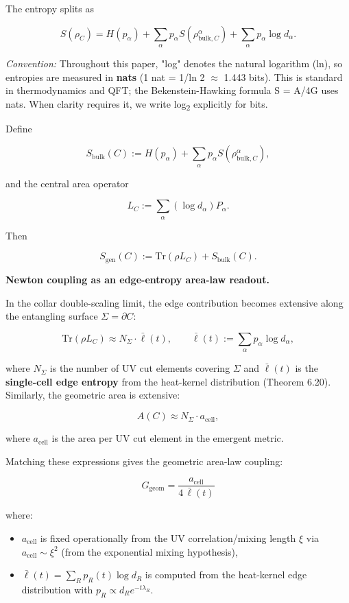 The entropy splits as

\[
S(\rho_C) = H(p_{\alpha}) + \sum_{\alpha} p_{\alpha} S(\rho_{\mathrm{bulk},C}^{\alpha}) + \sum_{\alpha} p_{\alpha} \log d_{\alpha}.
\]

\emph{Convention:} Throughout this paper, "log" denotes the natural logarithm (ln), so entropies are measured in \textbf{nats} (1 nat = 1/ln 2 \ensuremath{\approx} 1.443 bits). This is standard in thermodynamics and QFT; the Bekenstein-Hawking formula S = A/4G uses nats. When clarity requires it, we write log\textsubscript{2} explicitly for bits.

Define

\[
S_{\mathrm{bulk}}(C) := H(p_{\alpha}) + \sum_{\alpha} p_{\alpha} S(\rho_{\mathrm{bulk},C}^{\alpha}),
\]

and the central area operator

\[
L_C := \sum_{\alpha} (\log d_{\alpha}) P_{\alpha}.
\]

Then

\[
S_{\mathrm{gen}}(C) := \mathrm{Tr}(\rho L_C) + S_{\mathrm{bulk}}(C).
\]

\textbf{Newton coupling as an edge-entropy area-law readout.}

In the collar double-scaling limit, the edge contribution becomes extensive along the entangling surface \(\Sigma = \partial C\):

\[
\mathrm{Tr}(\rho L_C) \approx N_\Sigma \cdot \bar{\ell}(t),
\qquad
\bar{\ell}(t) := \sum_\alpha p_\alpha \log d_\alpha,
\]

where \(N_\Sigma\) is the number of UV cut elements covering \(\Sigma\) and \(\bar{\ell}(t)\) is the \textbf{single-cell edge entropy} from the heat-kernel distribution (Theorem 6.20). Similarly, the geometric area is extensive:

\[
A(C) \approx N_\Sigma \cdot a_{\mathrm{cell}},
\]

where \(a_{\mathrm{cell}}\) is the area per UV cut element in the emergent metric.

Matching these expressions gives the geometric area-law coupling:

\[
G_{\mathrm{geom}} = \frac{a_{\mathrm{cell}}}{4 \, \bar{\ell}(t)}
\]

where:

\begin{itemize}
\tightlist
\item
  \(a_{\mathrm{cell}}\) is fixed operationally from the UV correlation/mixing length \(\xi\) via \(a_{\mathrm{cell}} \sim \xi^2\) (from the exponential mixing hypothesis),
\item
  \(\bar{\ell}(t) = \sum_R p_R(t) \log d_R\) is computed from the heat-kernel edge distribution with \(p_R \propto d_R e^{-t\lambda_R}\).
\end{itemize}

